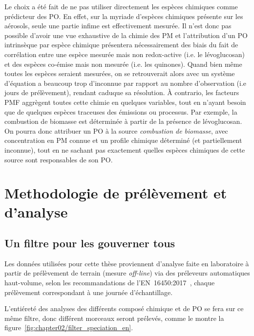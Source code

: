 Le choix a été fait de ne pas utiliser directement les espèces chimiques comme prédicteur
des PO. En effet, sur la myriade d'espèces chimiques présente sur les aérosols, seule une
partie infime est effectivement mesurée. Il n'est donc pas possible d'avoir une vue
exhaustive de la chimie des PM et l'attribution d'un PO intrinsèque par espèce chimique
présentera nécessairement des biais du fait de corrélation entre une espèce mesurée mais
non redox-active (i.e. le lévoglucosan) et des espèces co-émise mais non mesurée (i.e. les
quinones). Quand bien même toutes les espèces seraient mesurées, on se retrouverait alors
avec un système d'équation a beaucoup trop d'inconnue par rapport au nombre
d'observation (i.e jours de prélèvement), rendant caduque sa résolution.
À contrario, les facteurs PMF aggrègent toutes cette chimie en quelques variables, tout en
n'ayant besoin que de quelques espèces traceuses des émissions ou processus. Par exemple,
la combustion de biomasse est déterminée à partir de la présence de lévoglucosan. On pourra
donc attribuer un PO à la source \textit{combustion de biomasse}, avec concentration en PM
connue et un profile chimique déterminé (et partiellement inconnue), tout en ne sachant
pas exactement quelles espèces chimiques de cette source sont responsables de son PO.



\section{Methodologie de prélèvement et d'analyse}%
\label{sec:methodologie_de_prélèvement_et_d_analyse}


\subsection{Un filtre pour les gouverner tous}%
\label{sub:un_filtre_pour_les_gouverner_tous}

Les données utilisées pour cette thèse proviennent d'analyse faite en laboratoire à
partir de prélèvement de terrain (mesure \textit{off-line}) via des préleveurs
automatiques haut-volume, selon les recommandations de
l'EN~16450:2017~\autocite{cenAmbient2017a}, chaque prélèvement correspondant à une
journée d'échantillage. 

L'entiéreté des analyses des différents composé chimique et de PO se fera sur ce même
filtre, donc différent morceaux seront prélevés, comme le montre la
figure~\ref{fig:chapter02/filter_speciation_en}.

